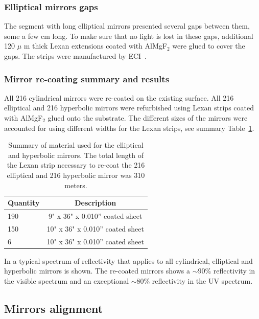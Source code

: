 \subsubsection{Elliptical mirrors gaps}

The segment with long elliptical mirrors presented several gaps between them, some a few cm long. To make sure that no light is lost in these gaps,
additional 120 $\mu$ m thick Lexan extensions coated with AlMgF$_2$ were glued to cover the gaps. The strips were manufactured by ECI~\cite{ECI}.


\subsubsection{Mirror re-coating summary and results}

All 216 cylindrical mirrors were re-coated on the existing surface. All 216 elliptical and 216 hyperbolic mirrors were refurbished using Lexan strips
coated with AlMgF$_2$ glued onto the substrate. The different sizes of the mirrors were accounted for using different widths for the Lexan strips, see
summary Table~\ref{tab:strips}.


\begin{table}[h]
	\begin{center}
		\begin{tabular}{| l | c |}
			\hline \hline
			Quantity  & Description \\
			\hline
			190       & 9" x 36" x 0.010” coated sheet    \\
			150       & 10" x 36" x 0.010” coated sheet   \\
			6         & 10" x 36" x 0.010” coated sheet   \\
			\hline \hline
		\end{tabular}
	\end{center}
	\caption{Summary of material used for the elliptical and hyperbolic mirrors. The total length of the Lexan strip necessary to re-coat the 216 elliptical
            and 216 hyperbolic mirror was 310 meters.}\label{tab:strips}
\end{table}


In  a typical spectrum of reflectivity that applies to all cylindrical, elliptical and hyperbolic mirrors is shown.
The re-coated mirrors shows a $\sim 90\%$ reflectivity in the visible spectrum and an exceptional $\sim 80\%$
reflectivity in the UV spectrum.



\subsection{Mirrors alignment}

